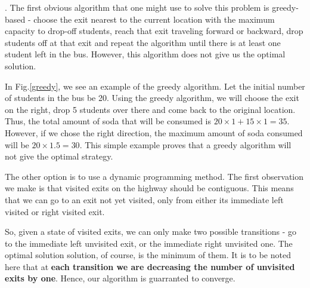 \documentclass[assign]{article}
\begin{document}
.  The first obvious algorithm that one might use to solve this problem is greedy-based - choose the exit nearest to the current location with the maximum capacity to drop-off students, reach that exit traveling forward or backward, drop students off at that exit and repeat the algorithm until there is at least one student left in the bus. However, this algorithm does not give us the optimal solution. 


In Fig.\ref{greedy}, we see an example of the greedy algorithm. Let the initial number of students in the bus be 20. Using the greedy algorithm, we will choose the exit on the right, drop 5 students over there and come back to the original location. Thus, the total 
amount of soda that will be consumed is $20 \times 1 + 15 \times 1 = 35.$  However, if we chose the right direction, the maximum amount of soda consumed will be $20 \times 1.5 = 30.$ This simple example proves that a greedy algorithm will not give the optimal strategy.

\noindent The other option is to use a dynamic programming method. The first observation we make is that visited exits on the highway should be contiguous. This means that we can go to an exit not yet visited, only from either its immediate left visited or right visited exit. 


So, given a state of visited exits, we can only make two possible transitions - go to the immediate left unvisited exit, or the immediate right unvisited one. The optimal solution solution, of course, is the minimum of them. It is to be noted here that at \textbf{each transition we are decreasing the number of unvisited exits by one}. Hence, our algorithm is guarranted to converge.   
\end{document}
